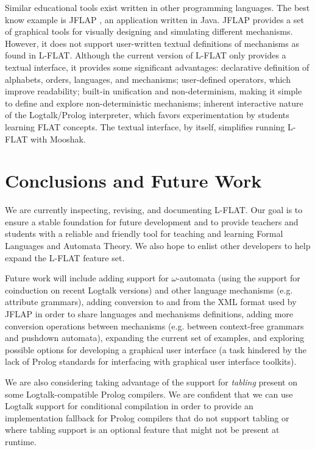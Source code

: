\documentclass{llncs}
\begin{document}
Similar educational tools exist written in other programming languages. The best know example is  JFLAP \cite{jflap}, an application written in Java. JFLAP provides a set of graphical tools for visually designing and simulating different mechanisms. However, it does not support user-written textual definitions of mechanisms as found in L-FLAT. Although the current version of L-FLAT only provides a textual interface, it provides some significant advantages: declarative definition of alphabets, orders, languages, and mechanisms; user-defined operators, which improve readability; built-in unification and non-determinism, making it simple to define and explore non-deterministic mechanisms; inherent interactive nature of the Logtalk/Prolog interpreter, which favors experimentation by students learning FLAT concepts. The textual interface, by itself, simplifies running L-FLAT with Mooshak.


\section{Conclusions and Future Work}

We are currently inspecting, revising, and documenting L-FLAT. Our goal is to ensure a stable foundation for future development and to provide teachers and students with a reliable and friendly tool for teaching and learning Formal Languages and Automata Theory. We also hope to enlist other developers to help expand the L-FLAT feature set. 

Future work will include adding support for $\omega$-automata (using the support for coinduction on recent Logtalk versions) and other language mechanisms (e.g. attribute grammars), adding conversion to and from the XML format used by JFLAP in order to share languages and mechanisms definitions, adding more conversion operations between mechanisms (e.g. between context-free grammars and pushdown automata), expanding the current set of examples, and exploring possible options for developing a graphical user interface (a task hindered by the lack of Prolog standards for interfacing with graphical  user interface toolkits).

We are also considering taking advantage of the support for \textsl{tabling} present on some Logtalk-compatible Prolog compilers. We are confident that we can use Logtalk support for conditional compilation in order to provide an implementation fallback for Prolog compilers that do not support tabling or where tabling support is an optional feature that might not be present at runtime.
\end{document}
